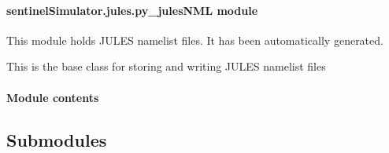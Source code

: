 \documentclass[letterpaper,10pt,english]{sphinxmanual}
\begin{document}
\paragraph{sentinelSimulator.jules.py\_julesNML module}
\label{source/sentinelSimulator.jules:module-sentinelSimulator.jules.py_julesNML}\label{source/sentinelSimulator.jules:sentinelsimulator-jules-py-julesnml-module}
This module holds JULES namelist files. 
It has been automatically generated.

\begin{fulllineitems}
\label{source/sentinelSimulator.jules:sentinelSimulator.jules.py_julesNML.julesNML}
This is the base class for storing
and writing JULES namelist files

\begin{fulllineitems}
\label{source/sentinelSimulator.jules:sentinelSimulator.jules.py_julesNML.julesNML.update}
\end{fulllineitems}


\begin{fulllineitems}
\label{source/sentinelSimulator.jules:sentinelSimulator.jules.py_julesNML.julesNML.write}
\end{fulllineitems}


\end{fulllineitems}



\paragraph{Module contents}
\label{source/sentinelSimulator.jules:module-contents}\label{source/sentinelSimulator.jules:module-sentinelSimulator.jules}

\subsection{Submodules}
\label{source/sentinelSimulator:submodules}
\end{document}
